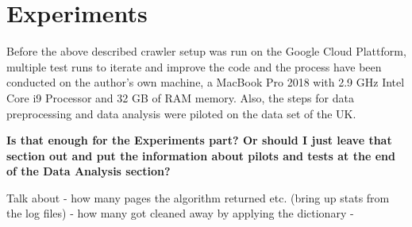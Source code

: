 \section{Experiments}
Before the above described crawler setup was run on the Google Cloud Plattform, multiple test runs to iterate and improve the code and the process have been conducted on the author's own machine, a MacBook Pro 2018 with 2.9 GHz Intel Core i9 Processor and 32 GB of RAM memory. Also, the steps for data preprocessing and data analysis were piloted on the data set of the UK.
\vspace{3pt}
\begin{center}
    \textbf{Is that enough for the Experiments part? Or should I just leave that section out and put the information about pilots and tests at the end of the Data Analysis section?}
\end{center}

Talk about 
- how many pages the algorithm returned etc. (bring up stats from the log files)
- how many got cleaned away by applying the dictionary 
- %
    

